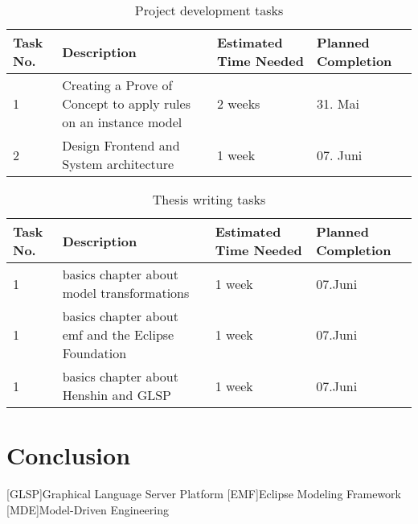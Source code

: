 \documentclass[conference,onecolumn]{IEEEtran}
\begin{document}
  \begin{table}[h!]
    \centering
    \caption{Project development tasks}
    \begin{tabular}{|p{0.5cm}|p{8cm}|p{1cm}|p{1cm}|}
      \hline
      \textbf{Task No.} & \textbf{Description} & \textbf{Estimated Time Needed} & \textbf{Planned Completion} \\
      \hline
      1 & Creating a Prove of Concept to apply rules on an instance model & 2 weeks & 31. Mai \\
      2 & Design Frontend and System architecture & 1 week & 07. Juni \\
      

      \hline
    \end{tabular}
  \end{table}

  \begin{table}[h!]
    \centering
    \caption{Thesis writing tasks}
    \begin{tabular}{|p{0.5cm}|p{8cm}|p{1cm}|p{1cm}|}
      \hline
      \textbf{Task No.} & \textbf{Description} & \textbf{Estimated Time Needed} & \textbf{Planned Completion} \\
      \hline
      1 & basics chapter about model transformations & 1 week & 07.Juni \\
      1 & basics chapter about \ac{emf} and the Eclipse Foundation & 1 week & 07.Juni \\
      1 & basics chapter about Henshin and GLSP & 1 week & 07.Juni \\     

      \hline
    \end{tabular}
  \end{table}

  \section{Conclusion}



  \printbibliography

\begin{acronym}
  [GLSP]{Graphical Language Server Platform}
  [EMF]{Eclipse Modeling Framework}
  [MDE]{Model-Driven Engineering}
\end{acronym}
\end{document}

